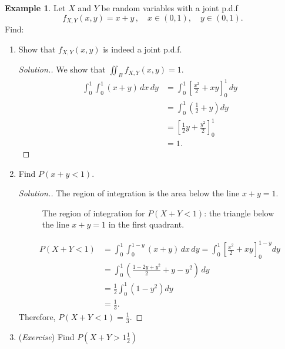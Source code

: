 \documentclass[12pt,a4paper]{report}
\theoremstyle{definition}
\newtheorem{example}[thm]{Example}
\theoremstyle{plain}
\theoremstyle{definition}
\begin{document}
\begin{example}
Let $X$ and $Y$ be random variables with a joint p.d.f 
\[f_{X,Y}(x,y)=x+y\, ,\quad x\in (0,1),\quad y\in (0,1).\]
Find:
\begin{enumerate}
\item[(i).] Show that $f_{X,Y}(x,y)$ is indeed a joint p.d.f.
\begin{proof}[\textit{Solution.}]
We show that $\iint_B f_{X,Y}(x,y) = 1.$
\begin{align*}
\int^1_0\int^1_0(x+y)\, dx\, dy & = \int^1_0\left[\frac{x^2}{2}+xy\right]^1_0\, dy\\
                                                       & = \int^1_0\left(\frac{1}{2}+y\right)dy\\
                                                       & = \left[\frac{1}{2}y+\frac{y^2}{2}\right]^1_0\\
                                                       & = 1.
\end{align*}
\end{proof}


\item[(ii).] Find $P(x+y<1)$.
\begin{proof}[\textit{Solution}.]
The region of integration is the area below the line $x + y = 1$.

\begin{figure}[H]
\centering
{}
\caption{The region of integration for $P(X+Y<1)$: the triangle below the line $x+y=1$ in the first quadrant.}
\end{figure}
\begin{align*}
P(X+Y <1) & = \int^1_0\int^{1-y}_0(x+y)\, dx\, dy
          = \int^1_0\left[\frac{x^2}{2}+xy\right]^{1-y}_0dy\\
         & = \int^1_0\left(\frac{1-2y+y^2}{2}+y-y^2\right)\, dy\\
         & = \frac{1}{2}\int^1_0(1-y^2)dy\\
        & = \frac{1}{3}.
\end{align*}
Therefore, $P(X + Y < 1) = \frac{1}{3}.$
\end{proof}

\item[(iii).] (\textit{Exercise}) Find $P\left(X+Y>1\frac{1}{2}\right)$
\end{enumerate}
\end{example}
\end{document}
